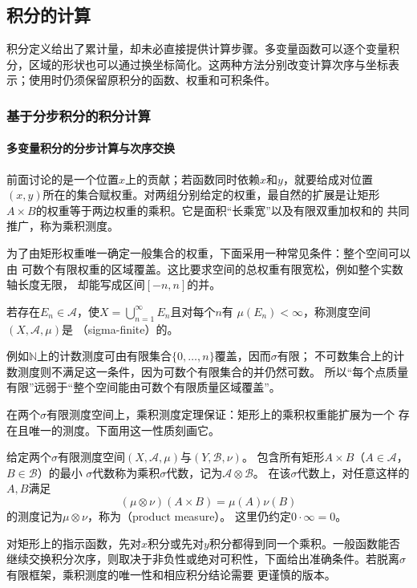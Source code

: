 \subsection{积分的计算}

积分定义给出了累计量，却未必直接提供计算步骤。多变量函数可以逐个变量积分，区域的形状也可以通过换坐标简化。这两种方法分别改变计算次序与坐标表示；使用时仍须保留原积分的函数、权重和可积条件。

\subsubsection{基于分步积分的积分计算}
\paragraph{多变量积分的分步计算与次序交换}

前面讨论的是一个位置$x$上的贡献；若函数同时依赖$x$和$y$，就要给成对位置
$(x,y)$所在的集合赋权重。对两组分别给定的权重，最自然的扩展是让矩形
$A\times B$的权重等于两边权重的乘积。它是面积“长乘宽”以及有限双重加权和的
共同推广，称为乘积测度。

为了由矩形权重唯一确定一般集合的权重，下面采用一种常见条件：整个空间可以由
可数个有限权重的区域覆盖。这比要求空间的总权重有限宽松，例如整个实数轴长度无限，
却能写成区间$[-n,n]$的并。
\begin{definition}
\label{def:analysis-sigma-finite-measure}
若存在$E_n\in\mathcal{A}$，使$X=\bigcup_{n=1}^{\infty}E_n$且对每个$n$有
$\mu(E_n)<\infty$，称测度空间$(X,\mathcal{A},\mu)$是
（sigma-finite）的。
\end{definition}
例如$\mathbb N$上的计数测度可由有限集合$\{0,\ldots,n\}$覆盖，因而$\sigma$有限；
不可数集合上的计数测度则不满足这一条件，因为可数个有限集合的并仍然可数。
所以“每个点质量有限”远弱于“整个空间能由可数个有限质量区域覆盖”。

在两个$\sigma$有限测度空间上，乘积测度定理保证：矩形上的乘积权重能扩展为一个
存在且唯一的测度。下面用这一性质刻画它。
\begin{definition}
\label{def:analysis-product-measure}
给定两个$\sigma$有限测度空间$(X,\mathcal{A},\mu)$与$(Y,\mathcal{B},\nu)$。
包含所有矩形$A\times B$（$A\in\mathcal{A}$，$B\in\mathcal{B}$）的最小
$\sigma$代数称为乘积$\sigma$代数，记为$\mathcal{A}\otimes\mathcal{B}$。
在该$\sigma$代数上，对任意这样的$A,B$满足
\[   (\mu\otimes\nu)(A\times B)=\mu(A)\nu(B) \]
的测度记为$\mu\otimes\nu$，称为（product measure）。
这里仍约定$0\cdot\infty=0$。
\end{definition}
对矩形上的指示函数，先对$x$积分或先对$y$积分都得到同一个乘积。一般函数能否继续交换积分次序，则取决于非负性或绝对可积性，下面给出准确条件。若脱离$\sigma$有限框架，乘积测度的唯一性和相应积分结论需要
更谨慎的版本。

